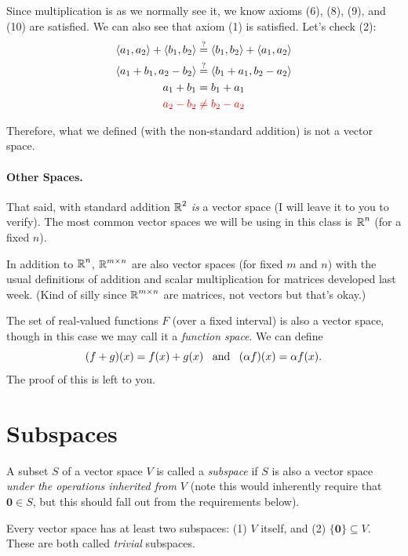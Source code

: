 Since multiplication is as we normally see it, we know axioms (6), (8), (9), and (10) are satisfied. 
We can also see that axiom (1) is satisfied.
Let's check (2): 
\[\begin{aligned}
\langle a_1,a_2\rangle + \langle b_1, b_2\rangle & \stackrel{?}{=}  \langle b_1, b_2\rangle + \langle a_1,a_2\rangle\\
\langle a_1+b_1, a_2-b_2\rangle & \stackrel{?}{=}  \langle b_1+a_1, b_2-a_2\rangle\\
a_1+b_1 & =  b_1+a_1\\
\color{red} a_2-b_2& \color{red}\ne  b_2-a_2\\
\end{aligned}\]

Therefore, what we defined (with the non-standard addition) is not a vector space. 


\paragraph{Other Spaces.} 
That said, with standard addition $\operatorname{\mathbb{R}}^2$ \emph{is} a vector space (I will leave it to you to verify).
The most common vector spaces we will be using in this class is $\operatorname{\mathbb{R}}^n$ (for a fixed $n$).

In addition to $\operatorname{\mathbb{R}}^n$, $\operatorname{\mathbb{R}}^{m\times n}$ are also vector spaces (for fixed $m$ and $n$)
with the usual definitions of addition and scalar multiplication for matrices developed last week. 
(Kind of silly since $\operatorname{\mathbb{R}}^{m\times n}$ are matrices, not vectors but that's okay.)

The set of real-valued functions $F$ (over a fixed interval) is also a vector space, 
though in this case we may call it a \emph{function space}. 
We can define 
\[(f+g)(x) = f(x) + g(x) \;\;\;\textnormal{and}\;\;\; (\alpha f)(x) = \alpha f(x).\]
The proof of this is left to you. 

\section{Subspaces}
A subset $S$ of a vector space $V$ is called a \emph{subspace} if $S$ is also a vector space \textit{under the operations inherited from $V$ } (note this would inherently require that $\mathbf{0}\in S$, but this should fall out from the requirements below).

Every vector space has at least two subspaces: (1) $V$ itself, and (2) $\{\mathbf{0}\}\subseteq V$. 
These are both called \textit{trivial} subspaces. 

